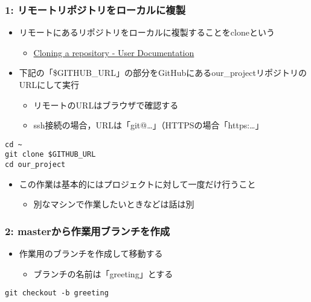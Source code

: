 \documentclass[a4paper,twoside,twocolumn]{bxjsarticle}
\begin{document}
\subsubsection{1: リモートリポジトリをローカルに複製}
\label{sec-2-3-2}
\begin{itemize}
\item リモートにあるリポジトリをローカルに複製することをcloneという
\begin{itemize}
\item \href{https://help.github.com/articles/cloning-a-repository/}{Cloning a repository - User Documentation}
\end{itemize}
\item 下記の「\$GITHUB\_URL」の部分をGitHubにあるour\_projectリポジトリのURLにして実行
\begin{itemize}
\item リモートのURLはブラウザで確認する
\item ssh接続の場合，URLは「git@\ldots{}」（HTTPSの場合「https:\ldots{}」
\end{itemize}
\end{itemize}

\begin{verbatim}
cd ~
git clone $GITHUB_URL
cd our_project
\end{verbatim}

\begin{itemize}
\item この作業は基本的にはプロジェクトに対して一度だけ行うこと
\begin{itemize}
\item 別なマシンで作業したいときなどは話は別
\end{itemize}
\end{itemize}

\subsubsection{2: masterから作業用ブランチを作成}
\label{sec-2-3-3}
\begin{itemize}
\item 作業用のブランチを作成して移動する
\begin{itemize}
\item ブランチの名前は「greeting」とする
\end{itemize}
\end{itemize}

\begin{verbatim}
git checkout -b greeting
\end{verbatim}
\end{document}
